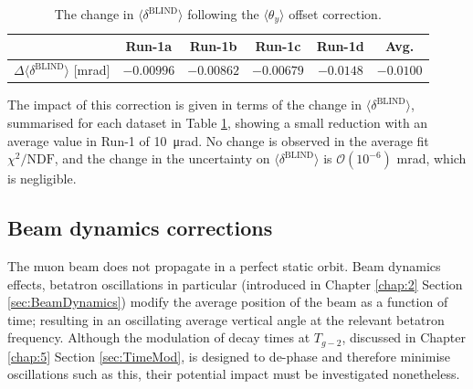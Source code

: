 \begin{table}[t!]
\centering{}
\begin{tabular}{l|ccccc}
\hline
\hline
 & Run-1a & Run-1b & Run-1c & Run-1d & Avg. \\ 
 \hline
$\Delta \langle \delta^{\text{BLIND}} \rangle $ [mrad] & $-0.00996$ & $-0.00862$ & $-0.00679$ & $-0.0148$ & $-0.0100$ \\ 
\hline
\hline
\end{tabular}
\caption{The change in $\langle \delta^{\text{BLIND}} \rangle$ following the $\langle \theta_{y} \rangle$ offset correction.}
\label{tbl:VertOffDiff}
\end{table}

The impact of this correction is given in terms of the change in $\langle \delta^{\text{BLIND}} \rangle$, summarised for each dataset in Table \ref{tbl:VertOffDiff}, showing a small reduction with an average value in Run-1 of \SI{10}{\micro\radian}. No change is observed in the average fit $\chi^{2}/\text{NDF}$, and the change in the uncertainty on $\langle \delta^{\text{BLIND}} \rangle$ is $\mathcal{O}(10^{-6})$ mrad, which is negligible. 

\subsection{Beam dynamics corrections}\label{subsec:BeamDynamicsCorr}
 
The muon beam does not propagate in a perfect static orbit. Beam dynamics effects, betatron oscillations in particular (introduced in Chapter \ref{chap:2} Section \ref{sec:BeamDynamics}) modify the average position of the beam as a function of time; resulting in an oscillating average vertical angle at the relevant betatron frequency. Although the modulation of decay times at $T_{g-2}$, discussed in Chapter \ref{chap:5} Section \ref{sec:TimeMod}, is designed to de-phase and therefore minimise oscillations such as this, their potential impact must be investigated nonetheless.


